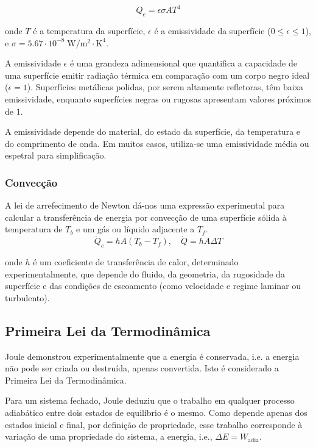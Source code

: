 \begin{equation}
    \dot{Q}_e = \epsilon \sigma A T^4
\end{equation}

onde $T$ é a temperatura da superfície, $\epsilon$ é a emissividade da superfície ($0 \leq \epsilon \leq 1$), e $\sigma = 5.67 \cdot 10^{-8} \; \text{W}/\text{m}^2 \cdot \text{K}^4$.

A emissividade $\epsilon$ é uma grandeza adimensional que quantifica a capacidade de uma superfície emitir radiação térmica em comparação com um corpo negro ideal ($\epsilon = 1$). Superfícies metálicas polidas, por serem altamente refletoras, têm baixa emissividade, enquanto superfícies negras ou rugosas apresentam valores próximos de $1$.

A emissividade depende do material, do estado da superfície, da temperatura e do comprimento de onda. Em muitos casos, utiliza-se uma emissividade média ou espetral para simplificação.


\subsubsection{Convecção}

A lei de arrefecimento de Newton dá-nos uma expressão experimental para calcular a transferência de energia por convecção de uma superfície sólida à temperatura de $T_b$ e um gás ou líquido adjacente a $T_f$.
\begin{equation}
    \dot{Q}_c = h A (T_b - T_f), \quad \dot{Q} = h A \Delta T
\end{equation}

onde $h$ é um coeficiente de transferência de calor, determinado experimentalmente, que depende do fluido, da geometria, da rugosidade da superfície e das condições de escoamento (como velocidade e regime laminar ou turbulento).


\subsection{Primeira Lei da Termodinâmica}

Joule demonstrou experimentalmente que a energia é conservada, i.e. a energia não pode ser criada ou destruída, apenas convertida. Isto é considerado a Primeira Lei da Termodinâmica.

Para um sistema fechado, Joule deduziu que o trabalho em qualquer processo adiabático entre dois estados de equilíbrio é o mesmo. Como depende apenas dos estados inicial e final, por definição de propriedade, esse trabalho corresponde à variação de uma propriedade do sistema, a energia, i.e., \(\Delta E = W_{\text{adia}}\).

